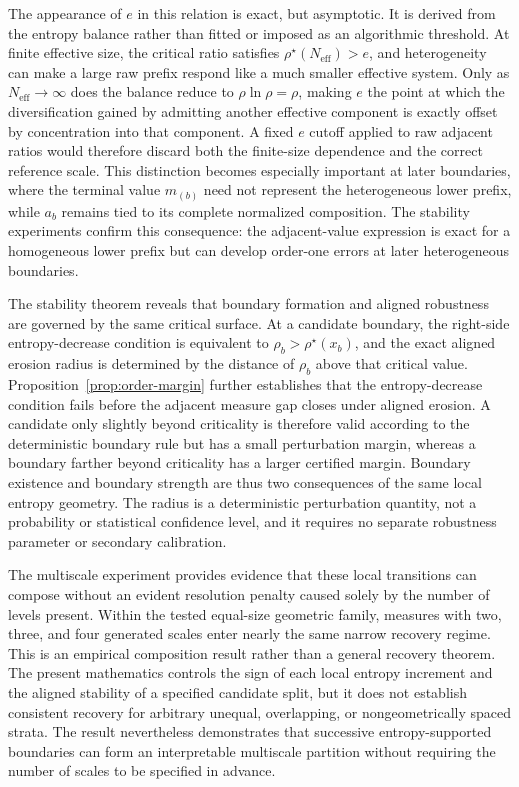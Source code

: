 \documentclass[aip,cha,reprint,superscriptaddress,floatfix]{revtex4-2}
\theoremstyle{definition}
\theoremstyle{remark}
\newcommand{\Neff}{N_{\mathrm{eff}}}
\newcommand{\rhostar}{\rho^{\star}}
\begin{document}
The appearance of \(e\) in this relation is exact, but asymptotic. It is derived from the entropy balance rather than fitted or imposed as an algorithmic threshold. At finite effective size, the critical ratio satisfies \(\rhostar(\Neff)>e\), and heterogeneity can make a large raw prefix respond like a much smaller effective system. Only as \(\Neff\to\infty\) does the balance reduce to \(\rho\ln\rho=\rho\), making \(e\) the point at which the diversification gained by admitting another effective component is exactly offset by concentration into that component. A fixed \(e\) cutoff applied to raw adjacent ratios would therefore discard both the finite-size dependence and the correct reference scale. This distinction becomes especially important at later boundaries, where the terminal value \(m_{(b)}\) need not represent the heterogeneous lower prefix, while \(a_b\) remains tied to its complete normalized composition. The stability experiments confirm this consequence: the adjacent-value expression is exact for a homogeneous lower prefix but can develop order-one errors at later heterogeneous boundaries.

The stability theorem reveals that boundary formation and aligned robustness are governed by the same critical surface. At a candidate boundary, the right-side entropy-decrease condition is equivalent to \(\rho_b>\rhostar(x_b)\), and the exact aligned erosion radius is determined by the distance of \(\rho_b\) above that critical value. Proposition~\ref{prop:order-margin} further establishes that the entropy-decrease condition fails before the adjacent measure gap closes under aligned erosion. A candidate only slightly beyond criticality is therefore valid according to the deterministic boundary rule but has a small perturbation margin, whereas a boundary farther beyond criticality has a larger certified margin. Boundary existence and boundary strength are thus two consequences of the same local entropy geometry. The radius is a deterministic perturbation quantity, not a probability or statistical confidence level, and it requires no separate robustness parameter or secondary calibration.

The multiscale experiment provides evidence that these local transitions can compose without an evident resolution penalty caused solely by the number of levels present. Within the tested equal-size geometric family, measures with two, three, and four generated scales enter nearly the same narrow recovery regime. This is an empirical composition result rather than a general recovery theorem. The present mathematics controls the sign of each local entropy increment and the aligned stability of a specified candidate split, but it does not establish consistent recovery for arbitrary unequal, overlapping, or nongeometrically spaced strata. The result nevertheless demonstrates that successive entropy-supported boundaries can form an interpretable multiscale partition without requiring the number of scales to be specified in advance.
\end{document}
